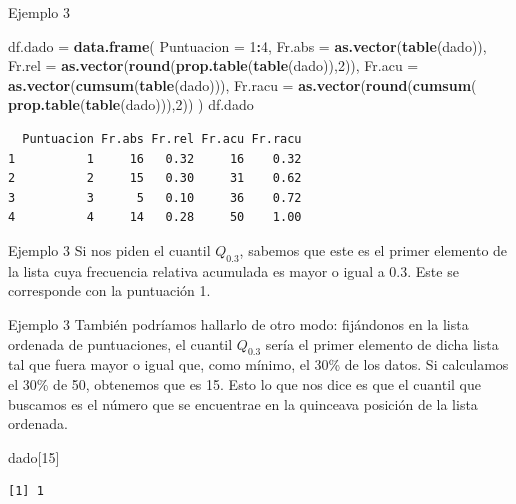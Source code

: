 \documentclass[
  ignorenonframetext,
]{beamer}
\newenvironment{Shaded}{\begin{snugshade}}{\end{snugshade}}
\newcommand{\AttributeTok}[1]{\textcolor[rgb]{0.13,0.29,0.53}{#1}}
\newcommand{\DecValTok}[1]{\textcolor[rgb]{0.00,0.00,0.81}{#1}}
\newcommand{\FunctionTok}[1]{\textcolor[rgb]{0.13,0.29,0.53}{\textbf{#1}}}
\newcommand{\NormalTok}[1]{#1}
\newcommand{\OtherTok}[1]{\textcolor[rgb]{0.56,0.35,0.01}{#1}}
\newcommand{\SpecialCharTok}[1]{\textcolor[rgb]{0.81,0.36,0.00}{\textbf{#1}}}
\begin{document}
\begin{frame}[fragile]{Ejemplo 3}
\label{ejemplo-3-11}
\begin{Shaded}
\begin{Highlighting}[]
\NormalTok{df.dado }\OtherTok{=} \FunctionTok{data.frame}\NormalTok{(}
  \AttributeTok{Puntuacion =} \DecValTok{1}\SpecialCharTok{:}\DecValTok{4}\NormalTok{,}
  \AttributeTok{Fr.abs =} \FunctionTok{as.vector}\NormalTok{(}\FunctionTok{table}\NormalTok{(dado)),}
  \AttributeTok{Fr.rel =} \FunctionTok{as.vector}\NormalTok{(}\FunctionTok{round}\NormalTok{(}\FunctionTok{prop.table}\NormalTok{(}\FunctionTok{table}\NormalTok{(dado)),}\DecValTok{2}\NormalTok{)),}
  \AttributeTok{Fr.acu =} \FunctionTok{as.vector}\NormalTok{(}\FunctionTok{cumsum}\NormalTok{(}\FunctionTok{table}\NormalTok{(dado))),}
  \AttributeTok{Fr.racu =} \FunctionTok{as.vector}\NormalTok{(}\FunctionTok{round}\NormalTok{(}\FunctionTok{cumsum}\NormalTok{(}
    \FunctionTok{prop.table}\NormalTok{(}\FunctionTok{table}\NormalTok{(dado))),}\DecValTok{2}\NormalTok{))}
\NormalTok{  )}
\NormalTok{df.dado}
\end{Highlighting}
\end{Shaded}

\begin{verbatim}
  Puntuacion Fr.abs Fr.rel Fr.acu Fr.racu
1          1     16   0.32     16    0.32
2          2     15   0.30     31    0.62
3          3      5   0.10     36    0.72
4          4     14   0.28     50    1.00
\end{verbatim}
\end{frame}

\begin{frame}{Ejemplo 3}
\label{ejemplo-3-12}
Si nos piden el cuantil \(Q_{0.3}\), sabemos que este es el primer
elemento de la lista cuya frecuencia relativa acumulada es mayor o igual
a 0.3. Este se corresponde con la puntuación 1.
\end{frame}

\begin{frame}[fragile]{Ejemplo 3}
\label{ejemplo-3-13}
También podríamos hallarlo de otro modo: fijándonos en la lista ordenada
de puntuaciones, el cuantil \(Q_{0.3}\) sería el primer elemento de
dicha lista tal que fuera mayor o igual que, como mínimo, el 30\% de los
datos. Si calculamos el 30\% de 50, obtenemos que es 15. Esto lo que nos
dice es que el cuantil que buscamos es el número que se encuentrae en la
quinceava posición de la lista ordenada.

\begin{Shaded}
\begin{Highlighting}[]
\NormalTok{dado[}\DecValTok{15}\NormalTok{]}
\end{Highlighting}
\end{Shaded}

\begin{verbatim}
[1] 1
\end{verbatim}
\end{frame}
\end{document}
